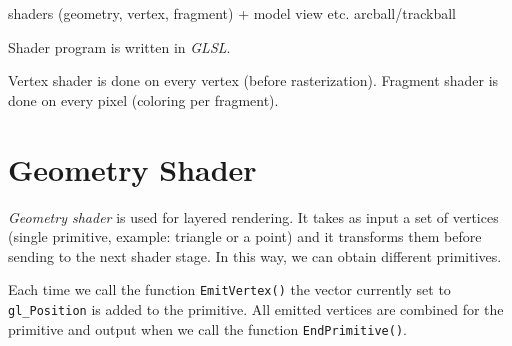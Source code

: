 shaders (geometry, vertex, fragment) + model view etc.
arcball/trackball

Shader program is written in \textit{GLSL}.

Vertex shader is done on every vertex (before rasterization).
Fragment shader is done on every pixel (coloring per fragment).

\section{Geometry Shader}
\textit{Geometry shader} is used for layered rendering. It takes as input a set of vertices (single primitive, example: triangle or a point) and it transforms them before sending to the next shader stage. In this way, we can obtain different primitives.

Each time we call the function \texttt{EmitVertex()} the vector currently set to \texttt{gl\_Position} is added to the primitive. All emitted vertices are combined for the primitive and output when we call the function \texttt{EndPrimitive()}.